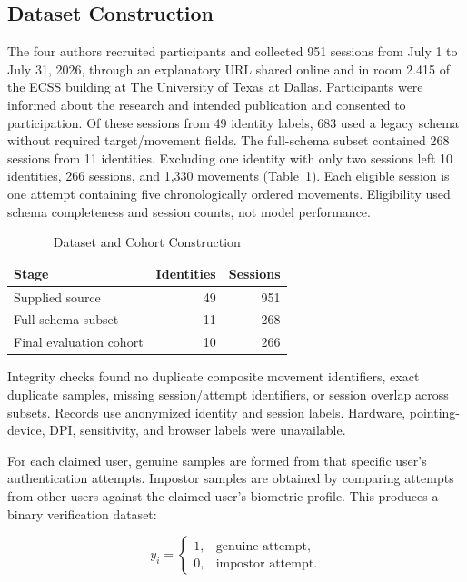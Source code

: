 \documentclass[conference]{IEEEtran}
\begin{document}
\subsection{Dataset Construction}

The four authors recruited participants and collected 951 sessions from July 1
to July 31, 2026, through an explanatory URL shared online and in room 2.415 of
the ECSS building at The University of Texas at Dallas. Participants were
informed about the research and intended publication and consented to
participation. Of these sessions from 49 identity labels, 683 used a legacy schema
without required target/movement fields. The full-schema subset contained
268 sessions from 11 identities. Excluding one identity with only two sessions
left 10 identities, 266 sessions, and 1,330 movements
(Table~\ref{tab:cohort_construction}). Each eligible session is one attempt
containing five chronologically ordered movements. Eligibility used schema
completeness and session counts, not model performance.

\begin{table}[t]
\centering
\caption{Dataset and Cohort Construction}
\label{tab:cohort_construction}
\begin{tabular}{lrr}
\toprule
\textbf{Stage} & \textbf{Identities} & \textbf{Sessions} \\
\midrule
Supplied source & 49 & 951 \\
Full-schema subset & 11 & 268 \\
Final evaluation cohort & 10 & 266 \\
\bottomrule
\end{tabular}
\end{table}

Integrity checks found no duplicate composite movement identifiers, exact
duplicate samples, missing session/attempt identifiers, or session overlap
across subsets. Records use anonymized identity and session labels.
Hardware, pointing-device, DPI, sensitivity, and browser labels
were unavailable.

For each claimed user, genuine samples are formed from that specific user's authentication attempts. Impostor samples are obtained by comparing attempts from other users against the claimed user's biometric profile. This produces a binary verification dataset:

\begin{equation}
y_i
=
\begin{cases}
1, & \text{genuine attempt},\\
0, & \text{impostor attempt}.
\end{cases}
\label{eq:binary_labels}
\end{equation}
\end{document}
